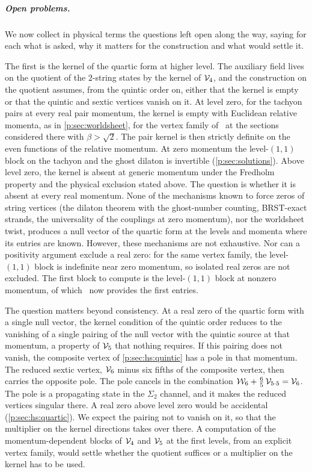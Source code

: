 \subparagraph{Open problems.}

We now collect in physical terms the questions left open along the way, saying for each what is asked, why it matters for the construction and what would settle it.

The first is the kernel of the quartic form at higher level.
The auxiliary field lives on the quotient of the $2$-string states by the kernel of $\mathcal{V}_{4}$, and the construction on the quotient assumes, from the quintic order on, either that the kernel is empty or that the quintic and sextic vertices vanish on it.
At level zero, for the tachyon pairs at every real pair momentum, the kernel is empty with Euclidean relative momenta, as in \cref{p:sec:worldsheet}, for the vertex family of~\cite{Erbin:2026:SL2CVerticesClosed} at the sections considered there with $\beta > \sqrt{2}$.
The pair kernel is then strictly definite on the even functions of the relative momentum.
At zero momentum the level-$(1, 1)$ block on the tachyon and the ghost dilaton is invertible (\cref{p:sec:solutions}).
Above level zero, the kernel is absent at generic momentum under the Fredholm property and the physical exclusion stated above.
  The question is whether it is absent at every real momentum.
  None of the mechanisms known to force zeros of string vertices (the dilaton theorem with the ghost-number counting, BRST-exact strands, the universality of the couplings at zero momentum), nor the worldsheet twist, produces a null vector of the quartic form at the levels and momenta where its entries are known.
  However, these mechanisms are not exhaustive.
  Nor can a positivity argument exclude a real zero: for the same vertex family, the level-$(1, 1)$ block is indefinite near zero momentum, so isolated real zeros are not excluded.
  The first block to compute is the level-$(1, 1)$ block at nonzero momentum, of which~\cite{Erbin:2026:SL2CVerticesClosed} now provides the first entries.

The question matters beyond consistency.
  At a real zero of the quartic form with a single null vector, the kernel condition of the quintic order reduces to the vanishing of a single pairing of the null vector with the quintic source at that momentum, a property of $\mathcal{V}_{5}$ that nothing requires.
  If this pairing does not vanish, the composite vertex of \cref{p:sec:hs:quintic} has a pole in that momentum.
The reduced sextic vertex, $\mathcal{V}_{6}$ minus six fifths of the composite vertex, then carries the opposite pole.
  The pole cancels in the combination $\mathcal{W}_{6} + \tfrac{6}{5} \, \mathcal{V}_{5 \cdot 5} = \mathcal{V}_{6}$.
  The pole is a propagating state in the $\Sigma_2$ channel, and it makes the reduced vertices singular there.
A real zero above level zero would be accidental (\cref{p:sec:hs:quartic}).
  We expect the pairing not to vanish on it, so that the multiplier on the kernel directions takes over there.
A computation of the momentum-dependent blocks of $\mathcal{V}_{4}$ and $\mathcal{V}_{5}$ at the first levels, from an explicit vertex family, would settle whether the quotient suffices or a multiplier on the kernel has to be used.

